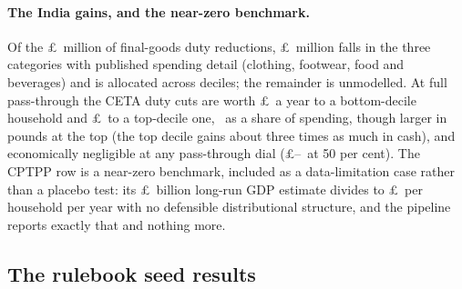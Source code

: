 \paragraph{The India gains, and the near-zero benchmark.} Of the \pounds\MsCetaTotalMillions\ million of final-goods duty
reductions, \pounds\MsCetaAllocatedMillions\ million falls in the
three categories with published spending detail (clothing, footwear,
food and beverages) and is allocated across deciles; the remainder is
unmodelled. At full pass-through the CETA duty cuts are worth \pounds\MsCetaGainGbpPtHundredDecOne\ a year
to a bottom-decile household and \pounds\MsCetaGainGbpPtHundredDecTen\
to a top-decile one, \MsCetaVerdict\ as a share of spending, though
larger in pounds at the top (the top decile gains about three times as much in
cash), and economically negligible at any pass-through dial
(\pounds\MsCetaGainGbpPtFiftyDecOne--\MsCetaGainGbpPtFiftyDecTen\ at
50 per cent). The CPTPP row is a near-zero benchmark, included as a
data-limitation case rather than a placebo test: its
\pounds\MsCptppGdpBn\ billion long-run GDP estimate divides to
\pounds\MsCptppNaiveGbpPerHousehold\ per household per year with no
defensible distributional structure, and the pipeline reports exactly
that and nothing more.

\subsection{The rulebook seed results}\label{sec:results-rulebook}

